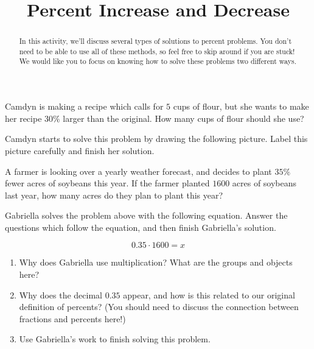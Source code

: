 \documentclass[noauthor,nooutcomes]{ximera}
\title{Percent Increase and Decrease}
\begin{document}
\begin{abstract} In this activity, we'll discuss several types of solutions to percent problems. You don't need to be able to use all of these methods, so feel free to skip around if you are stuck! We would like you to focus on knowing how to solve these problems two different ways. \end{abstract}
\maketitle



\begin{problem}
Camdyn is making a recipe which calls for $5$ cups of flour, but she wants to make her recipe $30\%$ larger than the original. How many cups of flour should she use?

\vskip 0.1in
Camdyn starts to solve this problem by drawing the following picture. Label this picture carefully and finish her solution.
\begin{center}
\end{center}
\end{problem}



\begin{problem}
A farmer is looking over a yearly weather forecast, and decides to plant $35\%$ fewer acres of soybeans this year. If the farmer planted $1600$ acres of soybeans last year, how many acres do they plan to plant this year?

\vskip 0.1in

Gabriella solves the problem above with the following equation. Answer the questions which follow the equation, and then finish Gabriella's solution.

\[
0.35 \cdot 1600 = x
\]

\begin{enumerate}
	\item Why does Gabriella use multiplication? What are the groups and objects here?
	\item Why does the decimal $0.35$ appear, and how is this related to our original definition of percents? (You should need to discuss the connection between fractions and percents here!)
	\item Use Gabriella's work to finish solving this problem.
\end{enumerate}
\end{problem}
\end{document}
